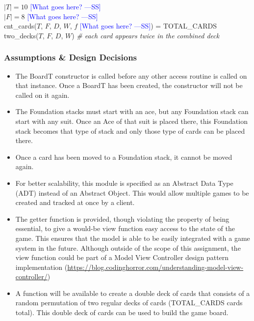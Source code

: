\documentclass[12pt]{article}
\newcommand{\authornote}[3]{\textcolor{#1}{[#3 ---#2]}}
\newcommand{\authornote}[3]{}
\newcommand{\wss}[1]{\authornote{blue}{SS}{#1}}
\begin{document}
$|T| = 10$  \wss{What goes here?}\\
$|F| = 8$  \wss{What goes here?}\\
cnt\_cards($T$, $F$, $D$, $W$, $f$ \wss{What goes here?}) = TOTAL\_CARDS\\
two\_decks($T$, $F$, $D$, $W$) \textit{\# each card appears twice in the combined deck}

\subsubsection* {Assumptions \& Design Decisions}

\begin{itemize}

\item The BoardT constructor is called before any other access
  routine is called on that instance. Once a BoardT has been created, the
  constructor will not be called on it again.

\item The Foundation stacks must start with an ace, but any Foundation stack can
  start with any suit. Once an Ace of that suit is placed there, this Foundation
  stack becomes that type of stack and only those type of cards can be placed
  there.

\item Once a card has been moved to a Foundation stack, it cannot be moved again.

\item For better scalability, this module is specified as an Abstract Data Type
  (ADT) instead of an Abstract Object. This would allow multiple games to be
  created and tracked at once by a client.

\item The getter function is provided, though violating the property of being
  essential, to give a would-be view function easy access to the state of the
  game. This ensures that the model is able to be easily integrated with a game
  system in the future.  Although outside of the scope of this assignment, the
  view function could be part of a Model View Controller design pattern implementation
  (\url{https://blog.codinghorror.com/understanding-model-view-controller/})

\item A function will be available to create a double deck of cards that
  consists of a random permutation of two regular decks of cards (TOTAL\_CARDS
  cards total).  This double deck of cards can be used to build the game board.

\end{itemize}
\end{document}
